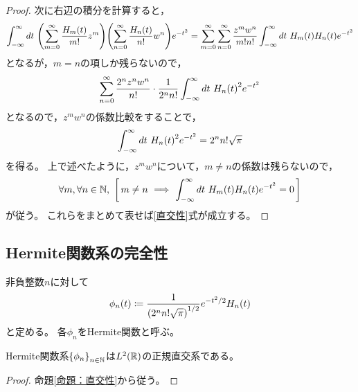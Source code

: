 \documentclass[a4paper,draft]{ltjsarticle}
\begin{document}
\begin{prop}
\begin{proof}
        次に右辺の積分を計算すると，
        \begin{equation}
            \int_{-\infty}^\infty dt\ \pare{\sum_{m=0}^\infty \dfrac{\fun{H_m}{t}}{m!}z^m}\pare{\sum_{n=0}^\infty \dfrac{\fun{H_n}{t}}{n!}w^n} e^{-t^2}
            =\sum_{m=0}^\infty\sum_{n=0}^\infty \dfrac{z^mw^n}{m!n!}\int_{-\infty}^\infty dt\ \fun{H_m}{t}\fun{H_n}{t}e^{-t^2}
        \end{equation}
        となるが，$m=n$の項しか残らないので，
        \begin{align}
            \sum_{n=0}^\infty \dfrac{2^nz^nw^n}{n!}\cdot \dfrac{1}{2^n n!}\int_{-\infty}^\infty dt\ \fun{H_n}{t}^2e^{-t^2}
        \end{align}
        となるので，$z^mw^n$の係数比較をすることで，
        \begin{align}
            \int_{-\infty}^\infty dt\ \fun{H_n}{t}^2e^{-t^2}
            =2^n n!\sqrt{\pi}
        \end{align}
        を得る。
        上で述べたように，$z^mw^n$について，$m\ne n$の係数は残らないので，
        \begin{align}
            \forall m, \forall n\in\N,\ \squ{\,m\ne n\ \Longrightarrow\ \int_{-\infty}^\infty dt\ \fun{H_m}{t}\fun{H_n}{t}e^{-t^2}=0\,}
        \end{align}
        が従う。
        これらをまとめて表せば\eqref{直交性}式が成立する。
    \end{proof}
\end{prop}

\subsection{Hermite関数系の完全性}
\begin{defi}[Hermite関数]
    非負整数$n$に対して
    \begin{equation}
        \fun{\phi_n}{t}\coloneqq \dfrac{1}{\pare{2^n n! \sqrt{\pi}}^{1/2}}e^{-t^2/2}\fun{H_n}{t}
    \end{equation}
    と定める。
    各$\phi_n$をHermite関数と呼ぶ。
\end{defi}


\begin{prop}
    Hermite関数系$\seq{\phi_n}{n\in\N}$は$\fun{L^2}{\R}$の正規直交系である。

    \begin{proof}
        命題\ref{命題：直交性}から従う。
    \end{proof}
\end{prop}
\end{document}
